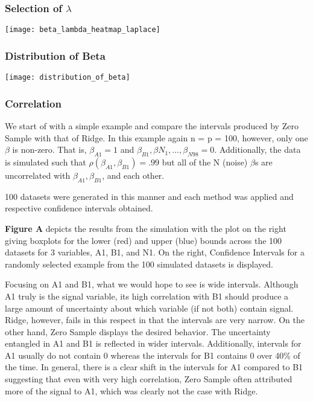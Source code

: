 \subsubsection{Selection of \texorpdfstring{$\lambda$}{lambda}}

\texttt{[image: beta\_lambda\_heatmap\_laplace]}

\subsubsection{Distribution of Beta}


\texttt{[image: distribution\_of\_beta]}

\subsubsection{Correlation}

We start of with a simple example and compare the intervals produced by Zero Sample with that of Ridge. In this example again n = p = 100, however, only one $\beta$ is non-zero. That is, $\beta_{A1} = 1$ and $\beta_{B1}, \beta{N_1}, \ldots, \beta_{N98} = 0$. Additionally, the data is simulated such that $\rho(\beta_{A1}, \beta_{B1}) = .99$ but all of the N (noise) $\beta$s are uncorrelated with $\beta_{A1}, \beta_{B1}$, and each other.

100 datasets were generated in this manner and each method was applied and respective confidence intervals obtained.

\textbf{Figure A} depicts the results from the simulation with the plot on the right giving boxplots for the lower (red) and upper (blue) bounds across the 100 datasets for 3 variables, A1, B1, and N1. On the right, Confidence Intervals for a randomly selected example from the 100 simulated datasets is displayed.

Focusing on A1 and B1, what we would hope to see is wide intervals. Although A1 truly is the signal variable, its high correlation with B1 should produce a large amount of uncertainty about which variable (if not both) contain signal. Ridge, however, fails in this respect in that the intervals are very narrow. On the other hand, Zero Sample displays the desired behavior. The uncertainty entangled in A1 and B1 is reflected in wider intervals. Additionally, intervals for A1 usually do not contain 0 whereas the intervals for B1 contains 0 over 40\% of the time. In general, there is a clear shift in the intervals for A1 compared to B1 suggesting that even with very high correlation, Zero Sample often attributed more of the signal to A1, which was clearly not the case with Ridge.

